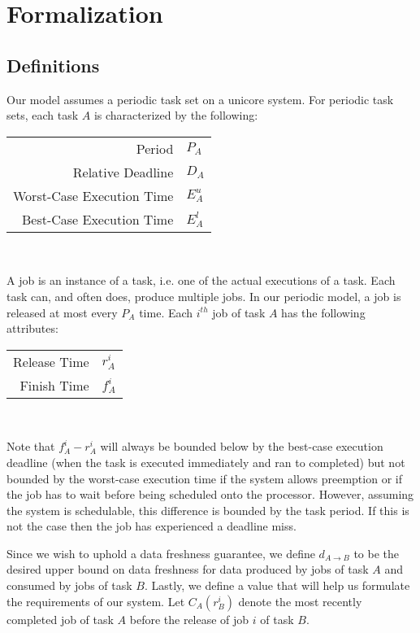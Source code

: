\section{Formalization}

\subsection{Definitions}

Our model assumes a periodic task set on a unicore system. For periodic task sets, each task $A$ is characterized by the following:

\begin{center}
	\begin{tabular}{|r|l|}
		\hline
		Period & $P_A$ \\
		Relative Deadline & $D_A$ \\
		Worst-Case Execution Time & $E^u_A$ \\
		Best-Case Execution Time & $E^l_A$ \\
		\hline
	\end{tabular}\\
\end{center}


A job is an instance of a task, i.e. one of the actual executions of a task. Each task can, and often does, produce multiple jobs. In our periodic model, a job is released at most every $P_A$ time. Each $i^{th}$ job of task $A$ has the following attributes:

\begin{center}
	\begin{tabular}{|r|l|}
		\hline
		Release Time & $r^i_A$ \\
		Finish Time & $f^i_A$ \\
		\hline
	\end{tabular}\\
\end{center}

Note that $f^i_A - r^i_A$ will always be bounded below by the best-case execution deadline (when the task is executed immediately and ran to completed) but not bounded by the worst-case execution time if the system allows preemption or if the job has to wait before being scheduled onto the processor. However, assuming the system is schedulable, this difference is bounded by the task period. If this is not the case then the job has experienced a deadline miss.

Since we wish to uphold a data freshness guarantee, we define $d_{A \to B}$ to be the desired upper bound on data freshness for data produced by jobs of task $A$ and consumed by jobs of task $B$. Lastly, we define a value that will help us formulate the requirements of our system. Let $C_A(r^i_B)$ denote the most recently completed job of task $A$ before the release of job $i$ of task $B$.

